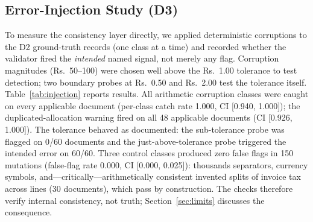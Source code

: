 \documentclass[conference]{IEEEtran}
\begin{document}
\subsection{Error-Injection Study (D3)}
To measure the consistency layer directly, we applied deterministic corruptions to the D2 ground-truth records (one class at a time) and recorded whether the validator fired the \emph{intended} named signal, not merely any flag. Corruption magnitudes (Rs.~50--100) were chosen well above the Rs.~1.00 tolerance to test detection; two boundary probes at Rs.~0.50 and Rs.~2.00 test the tolerance itself. Table~\ref{tab:injection} reports results. All arithmetic corruption classes were caught on every applicable document (per-class catch rate 1.000, CI [0.940, 1.000]); the duplicated-allocation warning fired on all 48 applicable documents (CI [0.926, 1.000]). The tolerance behaved as documented: the sub-tolerance probe was flagged on 0/60 documents and the just-above-tolerance probe triggered the intended error on 60/60. Three control classes produced zero false flags in 150 mutations (false-flag rate 0.000, CI [0.000, 0.025]): thousands separators, currency symbols, and---critically---arithmetically consistent invented splits of invoice tax across lines (30 documents), which pass by construction. The checks therefore verify internal consistency, not truth; Section~\ref{sec:limits} discusses the consequence.
\end{document}
